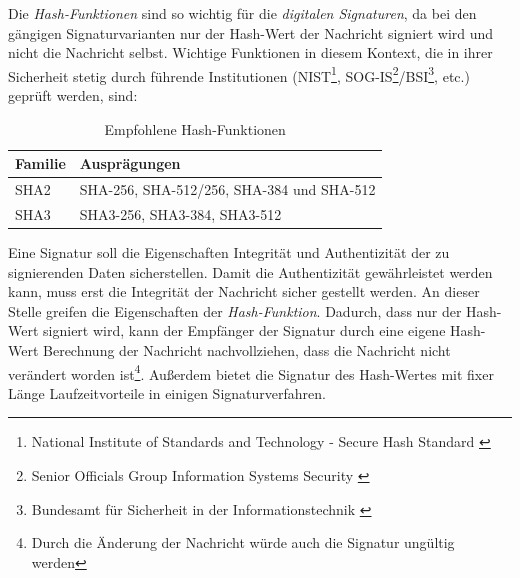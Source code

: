 \documentclass[11pt,a4paper,ngerman]{scrreprt}
\begin{document}
Die \textit{Hash-Funktionen} sind so wichtig für die \textit{digitalen Signaturen}, da bei den gängigen Signaturvarianten nur der Hash-Wert der Nachricht signiert wird und nicht die Nachricht selbst. Wichtige Funktionen in diesem Kontext, die in ihrer Sicherheit stetig durch führende Institutionen (NIST\footnote{National Institute of Standards and Technology - Secure Hash Standard \cite{shs180-4}}, SOG-IS\footnote{Senior Officials Group Information Systems Security \cite{sogisACM}}/BSI\footnote{Bundesamt für Sicherheit in der Informationstechnik \cite{bsi-tr-02102-1}}, etc.) geprüft werden, sind:
\begin{table}[h]
    \begin{tabularx}{\textwidth}{ lX }
        \toprule
        Familie & Ausprägungen \\ 
        \midrule
        SHA2 & SHA-256, SHA-512/256, SHA-384 und SHA-512 \\
        SHA3 & SHA3-256, SHA3-384, SHA3-512 \\
        \bottomrule
    \end{tabularx}
    \caption{Empfohlene Hash-Funktionen}
    \label{table:Hashfunktionen}
\end{table}

Eine Signatur soll die Eigenschaften Integrität und Authentizität der zu signierenden Daten sicherstellen. Damit die Authentizität gewährleistet werden kann, muss erst die Integrität der Nachricht sicher gestellt werden. An dieser Stelle greifen die Eigenschaften der \textit{Hash-Funktion}. Dadurch, dass nur der Hash-Wert signiert wird, kann der Empfänger der Signatur durch eine eigene Hash-Wert Berechnung der Nachricht nachvollziehen, dass die Nachricht nicht verändert worden ist\footnote{Durch die Änderung der Nachricht würde auch die Signatur ungültig werden}. Außerdem bietet die Signatur des Hash-Wertes mit fixer Länge Laufzeitvorteile in einigen Signaturverfahren.
\end{document}
